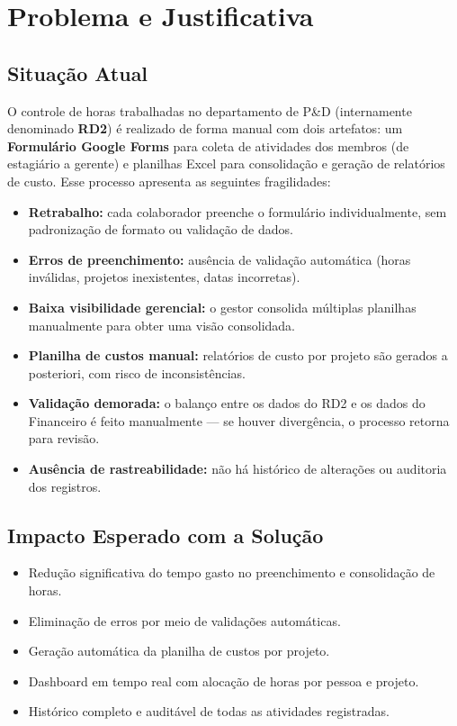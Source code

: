 \documentclass[12pt,a4paper]{article}
\begin{document}
\section{Problema e Justificativa}

\subsection{Situação Atual}

O controle de horas trabalhadas no departamento de P\&D (internamente denominado \textbf{RD2})
é realizado de forma manual com dois artefatos: um \textbf{Formulário Google Forms} para coleta
de atividades dos membros (de estagiário a gerente) e planilhas Excel para consolidação e
geração de relatórios de custo. Esse processo apresenta as seguintes fragilidades:

\begin{itemize}[leftmargin=1.5em]
  \item \textbf{Retrabalho:} cada colaborador preenche o formulário individualmente, sem
    padronização de formato ou validação de dados.
  \item \textbf{Erros de preenchimento:} ausência de validação automática (horas inválidas,
    projetos inexistentes, datas incorretas).
  \item \textbf{Baixa visibilidade gerencial:} o gestor consolida múltiplas planilhas
    manualmente para obter uma visão consolidada.
  \item \textbf{Planilha de custos manual:} relatórios de custo por projeto são gerados
    a posteriori, com risco de inconsistências.
  \item \textbf{Validação demorada:} o balanço entre os dados do RD2 e os dados do
    Financeiro é feito manualmente — se houver divergência, o processo retorna para revisão.
  \item \textbf{Ausência de rastreabilidade:} não há histórico de alterações ou auditoria
    dos registros.
\end{itemize}

\subsection{Impacto Esperado com a Solução}

\begin{itemize}[leftmargin=1.5em]
  \item Redução significativa do tempo gasto no preenchimento e consolidação de horas.
  \item Eliminação de erros por meio de validações automáticas.
  \item Geração automática da planilha de custos por projeto.
  \item Dashboard em tempo real com alocação de horas por pessoa e projeto.
  \item Histórico completo e auditável de todas as atividades registradas.
\end{itemize}
\end{document}
